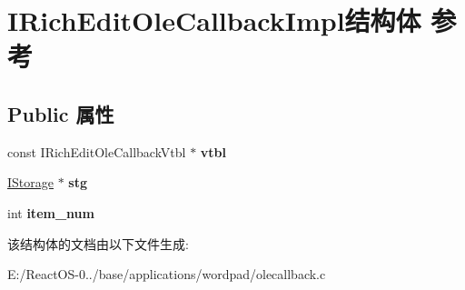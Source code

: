 \hypertarget{struct_i_rich_edit_ole_callback_impl}{}\section{I\+Rich\+Edit\+Ole\+Callback\+Impl结构体 参考}
\label{struct_i_rich_edit_ole_callback_impl}
\subsection*{Public 属性}
\begin{DoxyCompactItemize}
\item 
\mbox{\label{struct_i_rich_edit_ole_callback_impl_a9d734559abcded181ba07266a92cba81}} 
const I\+Rich\+Edit\+Ole\+Callback\+Vtbl $\ast$ {\bfseries vtbl}
\item 
\mbox{\label{struct_i_rich_edit_ole_callback_impl_acce0e90fae1961ec66210ed15b174e40}} 
\hyperlink{interface_i_storage}{I\+Storage} $\ast$ {\bfseries stg}
\item 
\mbox{\label{struct_i_rich_edit_ole_callback_impl_aabc24528b978513b58f71fd464def5db}} 
int {\bfseries item\+\_\+num}
\end{DoxyCompactItemize}


该结构体的文档由以下文件生成\+:\begin{DoxyCompactItemize}
\item 
E\+:/\+React\+O\+S-\/0../base/applications/wordpad/olecallback.\+c\end{DoxyCompactItemize}
